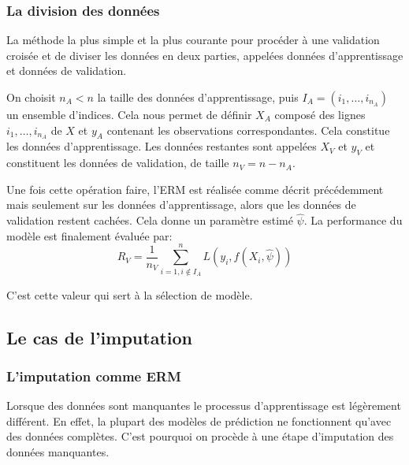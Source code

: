 \documentclass[12pt, a4paper]{article}
\begin{document}
\subsubsection{La division des données}
La méthode la plus simple et la plus courante pour procéder à une validation croisée et de diviser les données en deux parties, appelées données d'apprentissage et données de validation.

On choisit $n_A < n$ la taille des données d'apprentissage, puis $I_A = (i_1, \ldots, i_{n_A})$ un ensemble d'indices. Cela nous permet de définir $X_A$ composé des lignes $i_1, \ldots, i_{n_A}$ de $X$ et $y_A$ contenant les observations correspondantes. Cela constitue les données d'apprentissage. Les données restantes sont appelées $X_V$ et $y_V$ et constituent les données de validation, de taille $n_V = n- n_A$. 

Une fois cette opération faire, l'ERM est réalisée comme décrit précédemment mais seulement sur les données d'apprentissage, alors que les données de validation restent cachées. Cela donne un paramètre estimé $\hat{\psi}$. La performance du modèle est finalement évaluée par:
$$ R_{V} = \frac{1}{n_V} \sum\limits_{i=1, i \notin I_A}^n L(y_i, f(X_i, \hat{\psi}))$$

C'est cette valeur qui sert à la sélection de modèle.

\subsection{Le cas de l'imputation}

\subsubsection{L'imputation comme ERM}
Lorsque des données sont manquantes le processus d'apprentissage est légèrement différent. En effet, la plupart des modèles de prédiction ne fonctionnent qu'avec des données complètes. C'est pourquoi on procède à une étape d'imputation des données manquantes. 
\end{document}
